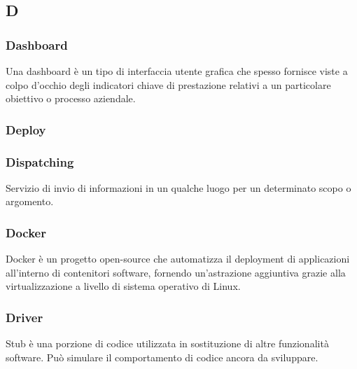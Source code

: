 \subsection*{\textbf{\hfill \Huge{D} \hfill}} 
\subsubsection*{Dashboard}
Una dashboard è un tipo di interfaccia utente grafica che spesso fornisce viste a colpo d’occhio degli indicatori chiave di prestazione relativi a un particolare obiettivo o processo aziendale.
\subsubsection*{Deploy}

\subsubsection*{Dispatching}
Servizio di invio di informazioni in un qualche luogo per un determinato scopo o argomento.
\subsubsection*{Docker}
Docker è un progetto open-source che automatizza il deployment di applicazioni all'interno di contenitori software, fornendo un'astrazione aggiuntiva grazie alla virtualizzazione a livello di sistema operativo di Linux.
\subsubsection*{Driver}
Stub è una porzione di codice utilizzata in sostituzione di altre funzionalità software. Può simulare il comportamento di codice ancora da sviluppare.

